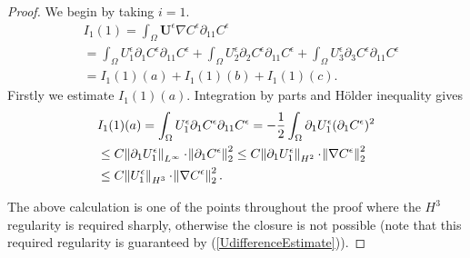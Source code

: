 \documentclass[11pt, a4paper]{article}
\begin{document}
\begin{proof}
We begin by taking $i=1.$
\begin{equation}
\begin{split}
& I_1(1) = \int_\Omega \mathbf{U}^\epsilon \nabla C^\epsilon \partial_{11} C^\epsilon \\
& = \int_\Omega U_1^\epsilon \partial_1 C^\epsilon \partial_{11} C^\epsilon + \int_\Omega U_2^\epsilon \partial_2 C^\epsilon \partial_{11} C^\epsilon + \int_\Omega U_3^\epsilon \partial_3 C^\epsilon \partial_{11} C^\epsilon \\
& = I_1(1)(a) + I_1(1)(b) + I_1(1)(c).
\end{split}
\end{equation}
Firstly we estimate $I_1(1)(a).$ Integration by parts  and H\"older inequality gives
%
%
\begin{equation}
\begin{split}
& I_1(1)(a) = \int_\Omega U_1^\epsilon \partial_1 C^\epsilon \partial_{11} C^\epsilon =- \frac{1}{2} \int_\Omega \partial_1 U_1^\epsilon (\partial_1 C^\epsilon)^2\\
& \leq C \norm{\partial_1 U_1^\epsilon}_{L^\infty} \cdot \norm{\partial_1 C^\epsilon}_2^2 \leq C \norm{\partial_1 U_1^\epsilon}_{H^2} \cdot \norm{\nabla C^\epsilon}_2^2 \\
& \leq C \norm{U_1^\epsilon}_{H^3} \cdot \norm{\nabla C^\epsilon}_2^2.
\end{split}
\end{equation}

The above calculation is one of the points throughout the proof where the $H^3$ regularity is required sharply, otherwise the closure is not possible (note that this required regularity is guaranteed by (\ref{UdifferenceEstimate})).


\end{proof}
\end{document}
